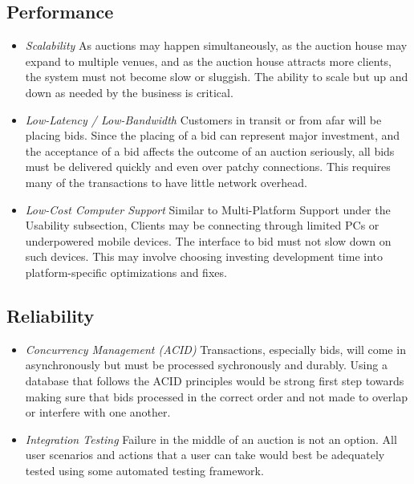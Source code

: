 \documentclass[titlepage, 12pt]{extarticle}
\begin{document}
\subsection{Performance}
\begin{itemize}
\item {\it Scalability} As auctions may happen simultaneously, as the auction house may expand to multiple venues, and as the auction house attracts more clients, the system must not become slow or sluggish. The ability to scale but up and down as needed by the business is critical.
\item {\it Low-Latency / Low-Bandwidth} Customers in transit or from afar will be placing bids. Since the placing of a bid can represent major investment, and the acceptance of a bid affects the outcome of an auction seriously, all bids must be delivered quickly and even over patchy connections. This requires many of the transactions to have little network overhead.
\item {\it Low-Cost Computer Support} Similar to Multi-Platform Support under the Usability subsection, Clients may be connecting through limited PCs or underpowered mobile devices. The interface to bid must not slow down on such devices. This may involve choosing investing development time into platform-specific optimizations and fixes.
\end{itemize}
\subsection{Reliability}
\begin{itemize}
\item {\it Concurrency Management (ACID)} Transactions, especially bids, will come in asynchronously but must be processed sychronously and durably. Using a database that follows the ACID principles would be strong first step towards making sure that bids processed in the correct order and not made to overlap or interfere with one another.
\item {\it Integration Testing} Failure in the middle of an auction is not an option. All user scenarios and actions that a user can take would best be adequately tested using some automated testing framework.
\end{itemize}
\end{document}
